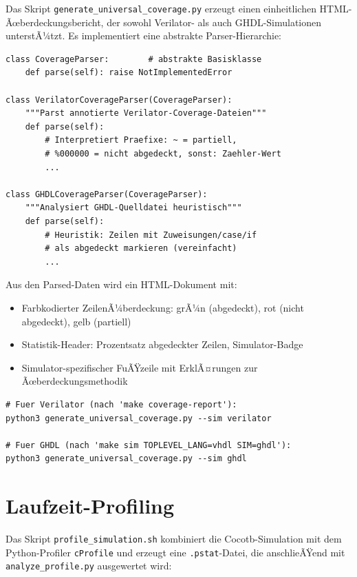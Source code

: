 ﻿\documentclass[12pt,a4paper]{report}
\begin{document}
Das Skript \texttt{generate\_universal\_coverage.py} erzeugt einen
einheitlichen HTML-Ãœber\-deckungsbericht, der sowohl Verilator- als auch
GHDL-Simulationen unterstÃ¼tzt. Es implementiert eine abstrakte Parser-Hierarchie:

\begin{lstlisting}[style=pythonstyle, caption={Abstrakte Parser-Hierarchie fÃ¼r universelle Coverage-Berichte}]
class CoverageParser:        # abstrakte Basisklasse
    def parse(self): raise NotImplementedError

class VerilatorCoverageParser(CoverageParser):
    """Parst annotierte Verilator-Coverage-Dateien"""
    def parse(self):
        # Interpretiert Praefixe: ~ = partiell,
        # %000000 = nicht abgedeckt, sonst: Zaehler-Wert
        ...

class GHDLCoverageParser(CoverageParser):
    """Analysiert GHDL-Quelldatei heuristisch"""
    def parse(self):
        # Heuristik: Zeilen mit Zuweisungen/case/if
        # als abgedeckt markieren (vereinfacht)
        ...
\end{lstlisting}

Aus den Parsed-Daten wird ein HTML-Dokument mit:
\begin{itemize}
    \item Farbkodierter ZeilenÃ¼berdeckung: grÃ¼n (abgedeckt), rot (nicht abgedeckt),
          gelb (partiell)
    \item Statistik-Header: Prozentsatz abgedeckter Zeilen, Simulator-Badge
    \item Simulator-spezifischer FuÃŸzeile mit ErklÃ¤rungen zur Ãœberdeckungsmethodik
\end{itemize}

\begin{lstlisting}[style=bashstyle, caption={Aufruf des universellen Ãœberdeckungsberichts}]
# Fuer Verilator (nach 'make coverage-report'):
python3 generate_universal_coverage.py --sim verilator

# Fuer GHDL (nach 'make sim TOPLEVEL_LANG=vhdl SIM=ghdl'):
python3 generate_universal_coverage.py --sim ghdl
\end{lstlisting}

\section{Laufzeit-Profiling}
\label{subsec:profiling}

Das Skript \texttt{profile\_simulation.sh} kombiniert die Cocotb-Simulation
mit dem Python-Profiler \texttt{cProfile} und erzeugt eine
\texttt{.pstat}-Datei, die anschlieÃŸend mit \texttt{analyze\_profile\newline .py}
ausgewertet wird:
\end{document}
